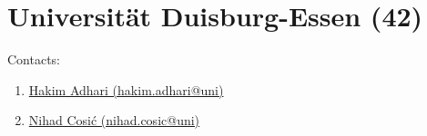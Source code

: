 \section{Universität Duisburg-Essen (42)}
\label{sec:UDE}

Contacts:
\begin{enumerate}
 \item {}\href{mailto:hakim.adhari@uni}{Hakim Adhari (hakim.adhari@uni)}
 \item {}\href{mailto:nihad.cosic@uni}{Nihad Cosić (nihad.cosic@uni)}
\end{enumerate}

